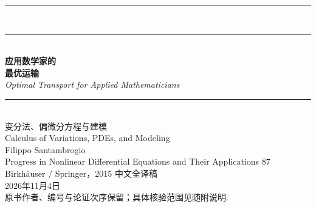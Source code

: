 \begin{titlepage}
\flushleft
\rule{\textwidth}{1.2pt}\\[.1cm]\rule{\textwidth}{.8pt}\\[1.4cm]
{\fontsize{36pt}{48pt}\selectfont\bfseries 应用数学家的\\最优运输}\\[.8cm]
{\Large\itshape Optimal Transport for Applied Mathematicians}\\[.8cm]
\rule{\textwidth}{.6pt}\\[.8cm]
{\Large 变分法、偏微分方程与建模}\\[.3cm]
{\large Calculus of Variations, PDEs, and Modeling}\\[1cm]
{\Large Filippo Santambrogio}\\[1cm]
{\small Progress in Nonlinear Differential Equations and Their Applications 87\\Birkhäuser / Springer，2015}
\vfill
{\small 中文全译稿\\2026年11月4日\\原书作者、编号与论证次序保留；具体核验范围见随附说明.}
\end{titlepage}
